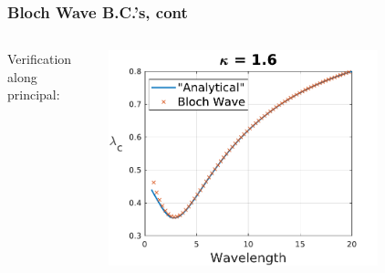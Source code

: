\documentclass{beamer}
\begin{document}
\begin{frame}

	\frametitle{Bloch Wave B.C.'s, cont}
	\begin{columns}
		Verification along principal:
		\begin{center}
	\includegraphics[width = 0.75\textwidth]{myFigures/blochWaveWorks}	
	\end{center}
	\end{columns}
	


\end{frame}
\end{document}

